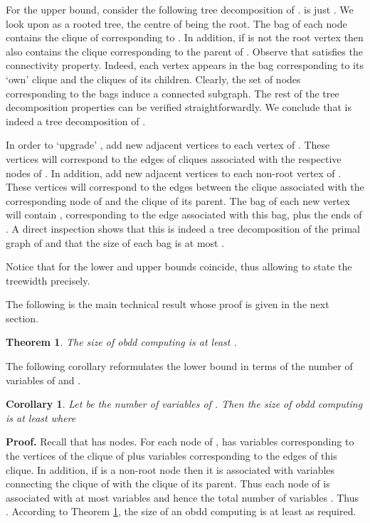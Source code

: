 \documentclass{article}
\newtheorem{theorem}{Theorem}
\newtheorem{corollary}{Corollary}
\begin{document}
For the upper bound,
consider the following tree decomposition  of .
 is just . We look upon  as a rooted tree, the centre of
 being the root. The bag  of each node  contains the clique of
 corresponding to . In addition, if  is not the root vertex
then  also contains the clique corresponding to the parent of . 
Observe that  satisfies the connectivity property.
Indeed, each vertex appears in the bag corresponding to its `own' clique and 
the cliques of its children. Clearly, the set of nodes corresponding to the bags 
induce a connected subgraph. The rest of the tree decomposition properties can
be verified straightforwardly. We conclude that  is indeed a tree
decomposition of .

In order to `upgrade' , add  new adjacent vertices 
to each vertex of . These vertices will correspond to the edges of cliques associated
with the respective nodes of . In addition, add  new adjacent vertices to each non-root vertex of . 
These vertices will correspond to the edges between the clique associated with the corresponding node of 
and the clique of its parent.
The bag of each new vertex will contain , corresponding to the edge  associated with this bag, 
plus the ends of . A direct inspection shows that this is indeed a tree decomposition
of the primal graph of  and that the size of each bag is at most .

Notice that for  the lower and upper bounds coincide, thus allowing to state
the treewidth precisely. 


The following is the main technical result whose proof is given in the next section. 
\begin{theorem} \label{maintheor}
The size of {\sc obdd} computing  is at least .
\end{theorem}


The following corollary reformulates the lower bound in terms of the number of variables of  and .

\begin{corollary} \label{reform1}
Let  be the number of variables of .
Then the size of {\sc obdd} computing  is at least
 where 
\end{corollary}

{\bf Proof.}
Recall that  has  nodes.
For each node  of ,  has  variables corresponding to the
vertices of the clique of  plus  variables corresponding to the edges
of this clique. In addition, if  is a non-root node then it is associated with 
variables connecting the clique of  with the clique of its parent. Thus each node of
 is associated with at most  variables and hence the total number of
variables .
Thus . According to Theorem \ref{maintheor}, the
size of an {\sc obdd} computing  is at least
 as required. 
\end{document}
